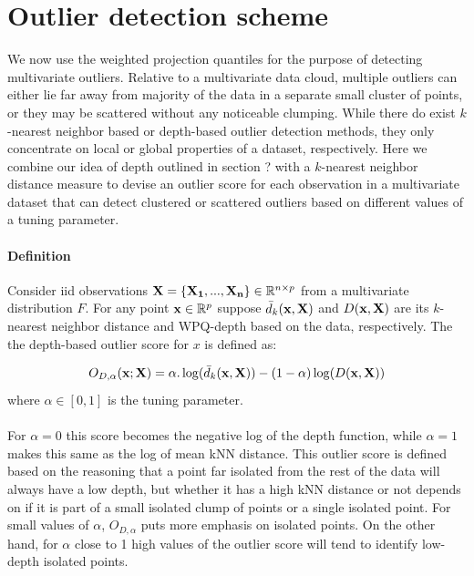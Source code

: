 \documentclass[10pt]{article}
\begin{document}
\section{Outlier detection scheme} We now use the weighted projection quantiles for the purpose of detecting multivariate outliers. Relative to a multivariate data cloud, multiple outliers can either lie far away from majority of the data in a separate small cluster of points, or they may be scattered without any noticeable clumping. While there do exist $k$-nearest neighbor based \cite{lof} or depth-based \cite{dang10, chen09} outlier detection methods, they only concentrate on local or global properties of a dataset, respectively. Here we combine our idea of depth outlined in section ? with a $k$-nearest neighbor distance measure to devise an outlier score for each observation in a multivariate dataset that can detect clustered or scattered outliers based on different values of a tuning parameter.

\paragraph{Definition}Consider iid observations ${\bf X} = \{{\bf X_1},...,{\bf X_n}\} \in \mathbb{R}^{n\times p}$ from a multivariate distribution $F$. For any point ${\bf x} \in \mathbb{R}^p$ suppose $\bar d_k({\bf x},{\bf X})$ and $D({\bf x}, {\bf X})$ are its $k$-nearest neighbor distance and WPQ-depth based on the data, respectively. The the depth-based outlier score for $x$ is defined as:

$$ O_{D,\alpha}({\bf x}; {\bf X}) = \alpha. \log (\bar d_k({\bf x},{\bf X})) - (1 - \alpha)\log (D({\bf x}, {\bf X}))$$
where $\alpha \in [0,1]$ is the tuning parameter.

\paragraph{}For $\alpha=0$ this score becomes the negative log of the depth function, while $\alpha=1$ makes this same as the log of mean kNN distance. This outlier score is defined based on the reasoning that a point far isolated from the rest of the data will always have a low depth, but whether it has a high kNN distance or not depends  on if it is part of a small isolated clump of points or a single isolated point. For small values of $\alpha$, $O_{D, \alpha}$ puts more emphasis on isolated points. On the other hand, for $\alpha$ close to 1 high values of the outlier score will tend to identify low-depth isolated points.
\end{document}
